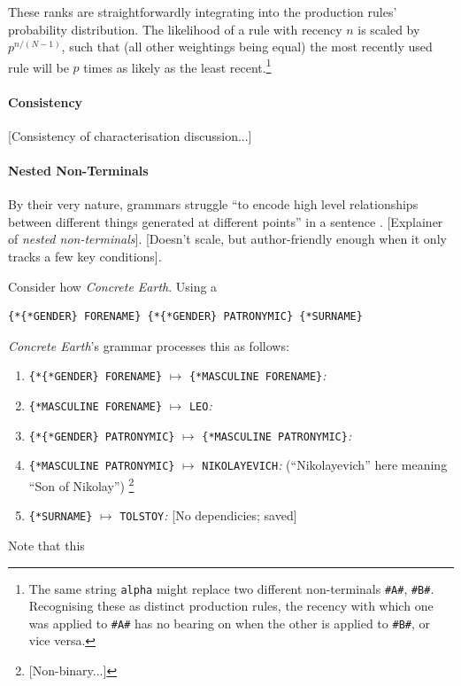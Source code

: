 \documentclass[a4paper, 11pt]{article}
\begin{document}
\begin{flushleft}
\vspace{5pt}\noindent
These ranks are straightforwardly integrating into the production rules' probability distribution. The likelihood of a rule with recency $n$ is scaled by $p^{n/(N-1)}$, such that (all other weightings being equal) the most recently used rule will be $p$ times as likely as the least recent.\footnote{The same string \texttt{alpha} might replace two different non-terminals \texttt{\#A\#}, \texttt{\#B\#}. Recognising these as distinct production rules, the recency with which one was applied to \texttt{\#A\#} has no bearing on when the other is applied to \texttt{\#B\#}, or vice versa.} 


\paragraph{Consistency} [Consistency of characterisation discussion...]

\vspace{5pt}

\paragraph{Nested Non-Terminals} By their very nature, grammars struggle ``to encode high level relationships between different things generated at different points'' in a sentence \citep{cmptn19}. [Explainer of \textit{nested non-terminals}]. [Doesn't scale, but author-friendly enough when it only tracks a few key conditions].

\vspace{5pt}\noindent
Consider how \textit{Concrete Earth}. Using a 
\begin{center}
\begin{BVerbatim}
{*{*GENDER} FORENAME} {*{*GENDER} PATRONYMIC} {*SURNAME}
\end{BVerbatim}
\end{center}
\textit{Concrete Earth}'s grammar processes this as follows:
\begin{enumerate}[label=\textit{\arabic*}\textit{.}, noitemsep]
\item \verb|{*{*GENDER} FORENAME}| $\mapsto$ \verb|{*MASCULINE FORENAME}|\textit{:} 
\item \verb|{*MASCULINE FORENAME}| $\mapsto$ \verb|LEO|\textit{:} 
\item \verb|{*{*GENDER} PATRONYMIC}| $\mapsto$ \verb|{*MASCULINE PATRONYMIC}|\textit{:} 
\item \verb|{*MASCULINE PATRONYMIC}| $\mapsto$ \verb|NIKOLAYEVICH|\textit{:} (``Nikolayevich'' here meaning ``Son of Nikolay'') \footnote{[Non-binary...]}
\item \verb|{*SURNAME}| $\mapsto$ \verb|TOLSTOY|\textit{:} [No dependicies; saved]
\end{enumerate}
Note that this



\end{flushleft}
\end{document}
